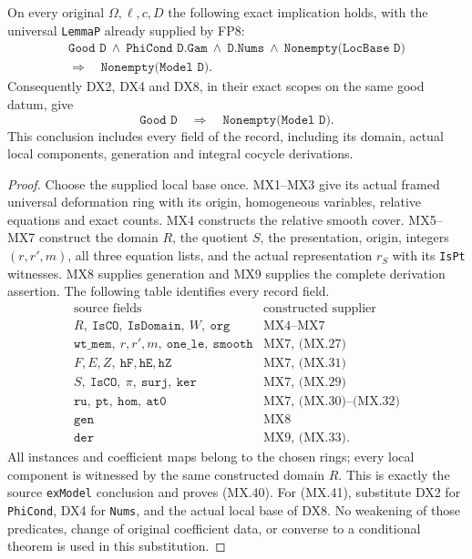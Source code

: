 \begin{theorem}
\label{claim:MX10}
On every original $\Omega,\ell,c,D$ the following exact
implication holds, with the universal \texttt{LemmaP}
already supplied by FP8:
\[
 \begin{gathered}
 \texttt{Good D}\ \wedge\ \texttt{PhiCond D.Gam}\
 \wedge\ \texttt{D.Nums}\ \wedge\
                         \texttt{Nonempty(LocBase D)}\\
             \Longrightarrow\quad\texttt{Nonempty(Model D)}.
 \end{gathered}
 \tag{MX.40}
\]
Consequently DX2, DX4 and DX8, in their exact scopes on
the same good datum, give
\[
       \texttt{Good D}\quad\Longrightarrow\quad
                              \texttt{Nonempty(Model D)}.
 \tag{MX.41}
\]
This conclusion includes every field of the record,
including its domain, actual local components, generation
and integral cocycle derivations.
\end{theorem}
\begin{proof}
Choose the supplied local base once.  MX1--MX3 give its
actual framed universal deformation ring with its origin,
homogeneous variables, relative equations and exact counts.
MX4 constructs the relative smooth cover.  MX5--MX7
construct the domain $R$, the quotient $S$, the presentation,
origin, integers $(r,r',m)$, all three equation lists,
and the actual representation $r_S$ with its \texttt{IsPt}
witnesses.  MX8 supplies generation and MX9 supplies
the complete derivation assertion.
The following table identifies every record field.
\[
 \begin{array}{c|l}
 \text{source fields}&\text{constructed supplier}\\ \hline
 R,\ \texttt{IsCO},\ \texttt{IsDomain},\ W,\ \texttt{org}
       &\text{MX4--MX7}\!\\
 \texttt{wt\_mem},\ r,r',m,\ \texttt{one\_le},\ \texttt{smooth}
       &\text{MX7, (MX.27)}\\
 F,E,Z,\ \texttt{hF},\texttt{hE},\texttt{hZ}
       &\text{MX7, (MX.31)}\\
 S,\ \texttt{IsCO},\ \pi,\ \texttt{surj},\ \texttt{ker}
       &\text{MX7, (MX.29)}\\
 \texttt{ru},\ \texttt{pt},\ \texttt{hom},\ \texttt{at0}
       &\text{MX7, (MX.30)--(MX.32)}\\
 \texttt{gen}&\text{MX8}\\
 \texttt{der}&\text{MX9, (MX.33).}
 \end{array}
 \tag{MX.42}
\]
All instances and coefficient maps belong to the chosen
rings; every local component is witnessed by the same
constructed domain $R$.  This is exactly the source
\texttt{exModel} conclusion and proves (MX.40).
For (MX.41), substitute DX2 for \texttt{PhiCond}, DX4
for \texttt{Nums}, and the actual local base of DX8.
No weakening of those predicates, change of original
coefficient data, or converse to a conditional theorem
is used in this substitution.
\end{proof}

